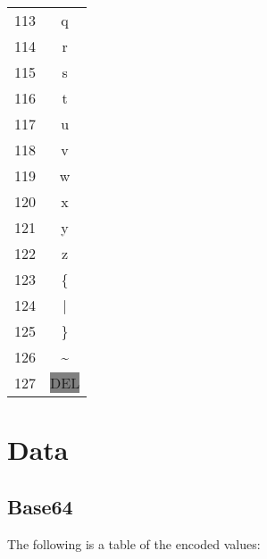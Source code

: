 \documentclass[12pt]{book}
\begin{document}
{\begin{tabular}{c c}
    113 & q \\
    114 & r \\
    115 & s \\
    116 & t \\
    117 & u \\
    118 & v \\
    119 & w \\
    120 & x \\
    121 & y \\
    122 & z \\
    123 & \{ \\
    124 & | \\
    125 & \} \\
    126 & \textasciitilde \\
    127 & \colorbox{gray}{DEL} \\
  \end{tabular}}

  \newpage
  \section{Data}

  \subsection{Base64}

  The following is a table of the encoded values:
\end{document}
